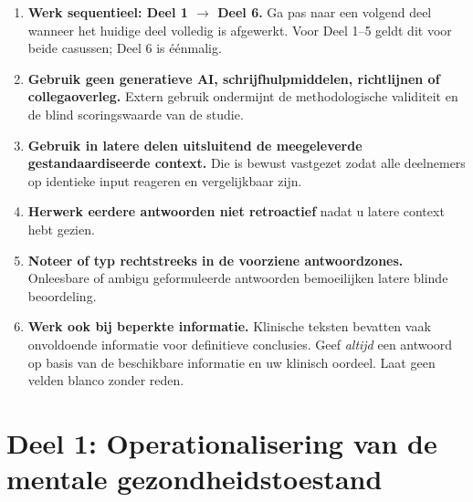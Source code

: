 \documentclass[11pt,a4paper]{article}
\begin{document}
\vspace{0.5em}
\begin{instrbox}[title={Werkwijze -- strikt te volgen}]
\begin{enumerate}[topsep=1pt,itemsep=2pt]
\item \textbf{Werk sequentieel: Deel 1 $\rightarrow$ Deel 6.}
Ga pas naar een volgend deel wanneer het huidige deel volledig is afgewerkt. Voor Deel 1--5 geldt dit voor beide casussen; Deel 6 is éénmalig.
\item \textbf{Gebruik geen generatieve AI, schrijfhulpmiddelen, richtlijnen of collegaoverleg.}
Extern gebruik ondermijnt de methodologische validiteit en de blind scoringswaarde van de studie.
\item \textbf{Gebruik in latere delen uitsluitend de meegeleverde gestandaardiseerde context.}
Die is bewust vastgezet zodat alle deelnemers op identieke input reageren en vergelijkbaar zijn.
\item \textbf{Herwerk eerdere antwoorden niet retroactief} nadat u latere context hebt gezien.
\item \textbf{Noteer of typ rechtstreeks in de voorziene antwoordzones.}
Onleesbare of ambigu geformuleerde antwoorden bemoeilijken latere blinde beoordeling.
\item \textbf{Werk ook bij beperkte informatie.} Klinische teksten bevatten vaak onvoldoende informatie voor definitieve conclusies. Geef \emph{altijd} een antwoord op basis van de beschikbare informatie en uw klinisch oordeel. Laat geen velden blanco zonder reden.
\end{enumerate}
\end{instrbox}

\newpage


\section{Deel 1: Operationalisering van de mentale gezondheidstoestand}
\end{document}

